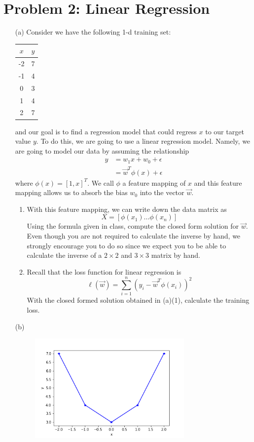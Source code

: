 \documentclass{article}
\begin{document}
\section*{Problem 2: Linear Regression}
\begin{enumerate}[(1)]
	\item[(a)] Consider we have the following 1-d training set:
	\begin{center}
		
		\begin{tabular}{|c|c|}
			\hline
			$x$ & $y$ \\
			\hline
			-2 & 7 \\
			-1 & 4 \\
			0 & 3 \\
			1 & 4 \\
			2 & 7 \\
			\hline
		\end{tabular}
	\end{center}
	and our goal is to find a regression model that could regress $x$ to our target value $y$. To do this, we are going to use a linear regression model. Namely, we are going to model our data by assuming the relationship 
	\begin{align*}
	y &= w_1x + w_0 + \epsilon \\
	&= \vec{w}^T\phi(x) + \epsilon
	\end{align*}
	where $\phi(x) = [1, x]^T$. We call $\phi$ a feature mapping of $x$ and this feature mapping allows us to absorb the bias $w_0$ into the vector $\vec{w}$. 
	\begin{enumerate}[(1)]
		\item With this feature mapping, we can write down the data matrix as 
		$$X = [\phi(x_1) ... \phi(x_n)]$$
		Using the formula given in class, compute the closed form solution for $\vec{w}$. Even though you are not required to calculate the inverse by hand, we strongly encourage you to do so since we expect you to be able to calculate the inverse of a $2 \times 2$ and $3 \times 3$ matrix by hand. 
		\item Recall that the loss function for linear regression is 
		$$\ell(\vec{w}) = \sum_{i = 1}^{n} (y_i - \vec{w}^T \phi(x_i))^2$$
		With the closed formed solution obtained in (a)(1), calculate the training loss. 
	\end{enumerate}
	\item[(b)] 
	\begin{figure}[h!]
		\centering
		\includegraphics[width=8cm]{plot.png}

\end{figure}
\end{enumerate}
\end{document}
